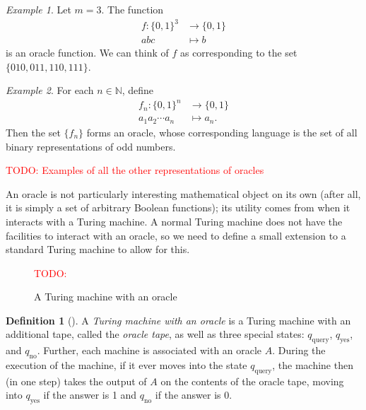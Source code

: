 \documentclass[english,12pt]{reedthesis}
\theoremstyle{plain}
\theoremstyle{definition}
\newtheorem{defn}[defn]{Definition}
\theoremstyle{remark}
\newtheorem{example}{Example}[thm]
\newcommand{\TODO}[1]{\textcolor{red}{TODO: #1}}
\begin{document}
\begin{example}\label{ex:oracle-function}
  Let $m = 3$. The function
  \begin{equation}
    \begin{aligned}
      f\colon \{0, 1\}^{3} &\rightarrow \{0, 1\} \\
      abc &\mapsto b
    \end{aligned}
  \end{equation}
  is an oracle function. We can think of $f$ as corresponding to the set
  $\{010, 011, 110, 111\}$.
\end{example}

\begin{example}\label{ex:oracle-full}
  For each $n \in \mathbb{N}$, define
  \begin{equation}
    \begin{aligned}
      f_{n}\colon \{0, 1\}^{n} &\rightarrow \{0, 1\} \\
      a_{1}a_{2} \cdots a_{n} &\mapsto a_{n}.
    \end{aligned}
  \end{equation}
  Then the set $\{f_{n}\}$ forms an oracle, whose corresponding language is the
  set of all binary representations of odd numbers.
\end{example}

\TODO{Examples of all the other representations of oracles}

An oracle is not particularly interesting mathematical object on its own (after
all, it is simply a set of arbitrary Boolean functions); its utility comes from
when it interacts with a Turing machine. A normal Turing machine does not have
the facilities to interact with an oracle, so we need to define a small
extension to a standard Turing machine to allow for this.

\begin{figure}[htbp]
  \TODO{}
  \caption{A Turing machine with an oracle}\label{fig:tm-oracle}
\end{figure}

\begin{defn}[{\cite[Def.\ 3.6]{AB09}}]\label{def:tm-oracle}
  A \emph{Turing machine with an oracle} is a Turing machine with an additional
  tape, called the \emph{oracle tape}, as well as three special states:
  $q_{\text{query}}$, $q_{\text{yes}}$, and $q_{\text{no}}$. Further, each
  machine is associated with an oracle $A$. During the execution of the machine,
  if it ever moves into the state $q_{\text{query}}$, the machine then (in one
  step) takes the output of $A$ on the contents of the oracle tape, moving into
  $q_{\text{yes}}$ if the answer is 1 and $q_{\text{no}}$ if the answer is 0.
\end{defn}
\end{document}
